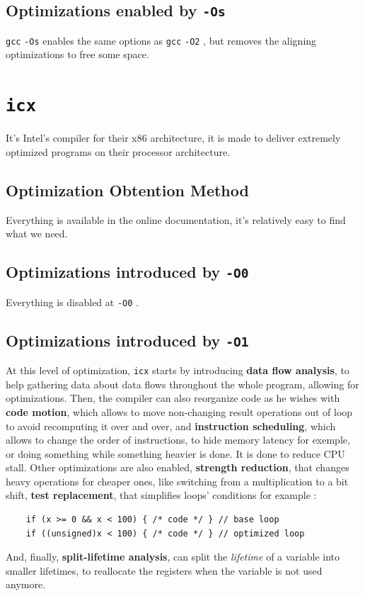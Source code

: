 \documentclass{rapport}
\newcommand{\gcc}{\texttt{gcc} }
\newcommand{\icx}{\texttt{icx} }
\newcommand{\optizero}{\texttt{-O0} }
\newcommand{\optione}{\texttt{-O1} }
\newcommand{\optitwo}{\texttt{-O2} }
\newcommand{\optisize}{\texttt{-Os} }
\begin{document}
\subsection*{Optimizations enabled by \optisize}
\gcc \optisize enables the same options as \gcc \optitwo, but removes the aligning optimizations to free some space.






\section{\icx}
It's Intel's compiler for their x86 architecture, it is made to deliver extremely optimized programs on their processor architecture.
\subsection*{Optimization Obtention Method}
Everything is available in the online documentation, it's relatively easy to find what we need.
\subsection*{Optimizations introduced by \optizero}
Everything is disabled at \optizero.
\subsection*{Optimizations introduced by \optione}
At this level of optimization, \icx starts by introducing \textbf{data flow analysis}, to help gathering data about data flows throughout the whole program, 
allowing for optimizations.\newline
Then, the compiler can also reorganize code as he wishes with \textbf{code motion}, which allows to move non-changing result operations out of loop to avoid 
recomputing it over and over, and \textbf{instruction scheduling}, which allows to change the order of instructions, to hide memory latency for exemple, 
or doing something while something heavier is done. It is done to reduce CPU stall.
\newline\newline
Other optimizations are also enabled, \textbf{strength reduction}, that changes heavy operations for cheaper ones, like switching from a multiplication to a bit shift, \textbf{test replacement}, that simplifies loops' conditions for example : 
\begin{verbatim}
    if (x >= 0 && x < 100) { /* code */ } // base loop
    if ((unsigned)x < 100) { /* code */ } // optimized loop
\end{verbatim}
And, finally, \textbf{split-lifetime analysis}, can split the \textit{lifetime} of a variable into smaller lifetimes, to reallocate the registers when the variable is not used anymore.
\end{document}
